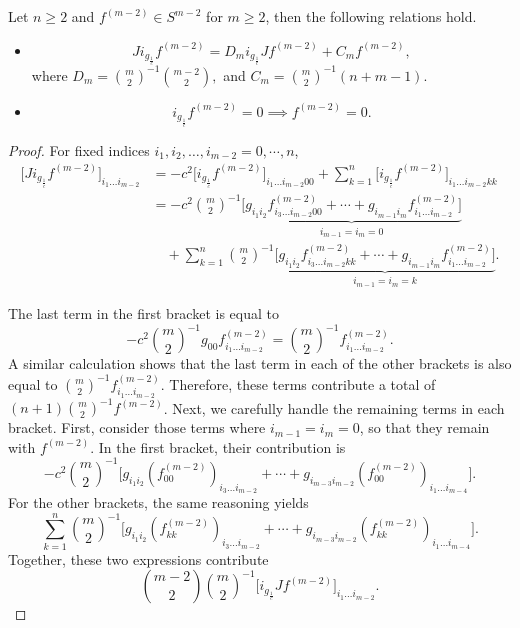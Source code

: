 \documentclass[10pt,a4paper]{amsart}
\newcommand{\gc}{i_{g_{\frac{1}{c}}}}
\begin{document}
	\begin{lemma}\label{lem_commutator}
Let $n\ge 2$ and   $f^{(m-2)} \in S^{m-2}$ for $m\ge 2$, then the following relations hold.
\begin{itemize}
\item [1.]	\[J\gc f^{(m-2)}= D_{m}\gc Jf^{(m-2)}+ C_mf^{(m-2)},\] 
where $D_m=\binom{m}{2}^{-1}\binom{m-2}{2},$ and $C_m=\binom{m}{2}^{-1}(n+m-1)$.
\item [2.] \[\gc f^{(m-2)}=0 \implies  f^{(m-2)}=0.\]
\end{itemize}
	\end{lemma}

	\begin{proof}
		 For fixed indices $i_1,i_2,\dots,i_{m-2} = 0,\cdots,n$,
		\begin{equation*}
			\begin{aligned}
				\Big[J\gc f^{(m-2)} \Big]_{i_1\dots i_{m-2}}&=-c^2\Big[\gc f^{(m-2)} \Big]_{i_1\dots i_{m-2}00}+\sum_{k=1}^n\Big[\gc f^{(m-2)} \Big]_{i_1\dots i_{m-2}kk}\\
				&=-c^2\binom{m}{2}^{-1}\underbrace{\Big[g_{i_1i_2}f^{(m-2)}_{i_3\dots i_{m-2}00}+\cdots +g_{i_{m-1}i_m}f^{(m-2)}_{i_1\dots i_{m-2}} \Big]}_{i_{m-1}=i_m=0}\\
				&\quad+\sum_{k=1}^{n}\binom{m}{2}^{-1}\underbrace{\Big[g_{i_1i_2}f^{(m-2)}_{i_3\dots i_{m-2}kk}+\cdots +g_{i_{m-1}i_m}f^{(m-2)}_{i_1\dots i_{m-2}} \Big]}_{i_{m-1}=i_m=k}.
			\end{aligned}
		\end{equation*}
		
The last term in the first bracket is equal to 
\[
-c^2 \binom{m}{2}^{-1} g_{00} f^{(m-2)}_{i_1 \dots i_{m-2}}
= \binom{m}{2}^{-1} f^{(m-2)}_{i_1 \dots i_{m-2}}.
\]
A similar calculation shows that the last term in each of the other brackets is also equal to 
		\(\binom{m}{2}^{-1} f^{(m-2)}_{i_1 \dots i_{m-2}}\). 
		Therefore, these terms contribute a total of 
		\((n+1)\binom{m}{2}^{-1} f^{(m-2)}\).
		Next, we carefully handle the remaining terms in each bracket.  
		First, consider those terms where \(i_{m-1} = i_m = 0\), so that they remain with \(f^{(m-2)}\). 
		In the first bracket, their contribution is 
		\[
		-c^2 \binom{m}{2}^{-1} \Big[
		g_{i_1 i_2}(f^{(m-2)}_{00})_{i_3 \dots i_{m-2}} 
		+ \cdots 
		+ g_{i_{m-3} i_{m-2}}(f^{(m-2)}_{00})_{i_1 \dots i_{m-4}}
		\Big].
		\]
		For the other brackets, the same reasoning yields 
		\[
		\sum_{k=1}^{n} \binom{m}{2}^{-1} \Big[
		g_{i_1 i_2}(f^{(m-2)}_{kk})_{i_3 \dots i_{m-2}} 
		+ \cdots 
		+ g_{i_{m-3} i_{m-2}}(f^{(m-2)}_{kk})_{i_1 \dots i_{m-4}}
		\Big].
		\]
		Together, these two expressions contribute 
		\[
		\binom{m-2}{2} \binom{m}{2}^{-1} 
		\big[ \gc J f^{(m-2)} \big]_{i_1 \dots i_{m-2}}.
		\]
		

\end{proof}
\end{document}

